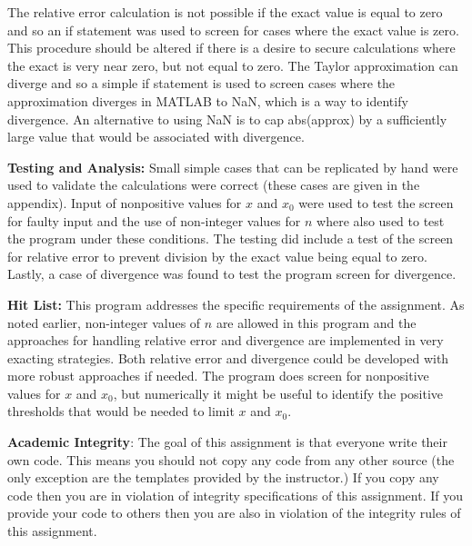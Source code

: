 \documentclass{article}
\def\ds{\displaystyle}
\begin{document}
The relative error calculation is not possible if the exact value is equal to zero and so an if statement was used to screen for cases where the exact value is zero. This procedure should be altered if there is a desire to secure calculations where the exact is very near zero, but not equal to zero. The Taylor approximation can diverge and so a simple if statement is used to screen cases where the approximation diverges in MATLAB to NaN, which is a way to identify divergence. An alternative to using NaN is to cap abs(approx) by a sufficiently large value that would be associated with divergence. 
\par \bigskip \par


{\bf Testing and Analysis:} Small simple cases that can be replicated by hand were used to validate the calculations were correct (these cases are given in the appendix). Input of nonpositive values for $x$ and $\ds x_0$ were used to test the screen for faulty input and the use of non-integer values for $n$ where also used to test the program under these conditions. The testing did include a test of the screen for relative error to prevent division by the exact value being equal to zero. Lastly, a case of divergence was found to test the program screen for divergence. 
\par \bigskip \par

{\bf Hit List: }This program addresses the specific requirements of the assignment. As noted earlier, non-integer values of $n$ are allowed in this program and the approaches for handling relative error and divergence are implemented in very exacting strategies. Both relative error and divergence could be developed with more robust approaches if needed. The program does screen for nonpositive values for $x$ and $\ds x_0$, but numerically it might be useful to identify the positive thresholds that would be needed to limit $x$ and $\ds x_0$. 
\par \bigskip \par


{\bf Academic Integrity}: {\color{red} The goal of this assignment is that everyone write their own code. This means you should not copy any code from any other source (the only exception are the templates provided by the instructor.) If you copy any code then you are in violation of integrity specifications of this assignment. If you provide your code to others then you are also in violation of the integrity rules of this assignment.  }
\end{document}

